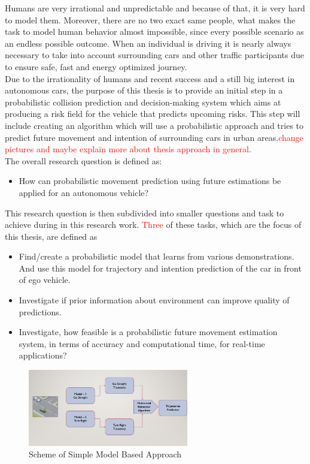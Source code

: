 Humans are very irrational and unpredictable and because of that, it is very hard to model them. Moreover, there are no two exact same people, what makes the task to model human behavior almost impossible, since every possible scenario as an endless possible outcome. When an individual is driving it is nearly always necessary to take into account surrounding cars and other traffic participants due to ensure safe, fast and energy optimized journey. \\
Due to the irrationality of humans and recent success and a still big interest in autonomous cars, the purpose of this thesis is to provide an initial step in a probabilistic collision prediction and decision-making system which aims at producing a risk field for the vehicle that predicts
upcoming risks. This step will include creating an algorithm which will use a probabilistic approach and tries to predict future movement and intention of surrounding cars in urban areas.\textcolor{red}{change pictures and maybe explain more about thesis approach in general}.\\
The overall research question is defined
as:
\begin{itemize}
	\item How can probabilistic movement prediction using future estimations be applied for an autonomous vehicle?
\end{itemize}
This research question is then subdivided into smaller questions and task to achieve during in this research work. \textcolor{red}{Three} of these tasks, which are the focus of this thesis, are defined as
\begin{itemize}
	\item Find/create a probabilistic model that learns from various demonstrations. And use this model for trajectory and intention prediction of the car in front of ego vehicle.
	\item Investigate if prior information about environment can improve quality of predictions.
	\item Investigate, how feasible is a probabilistic future movement estimation system, in terms of accuracy and computational time, for real-time applications?
\end{itemize}

\begin{figure}[h]
	\centering  	
	\includegraphics[width=7cm]{img/3.jpg}
	\caption{Scheme of Simple Model Based Approach \cite{pic2}}
	\label{fig:ModBasedApp}    
\end{figure}

